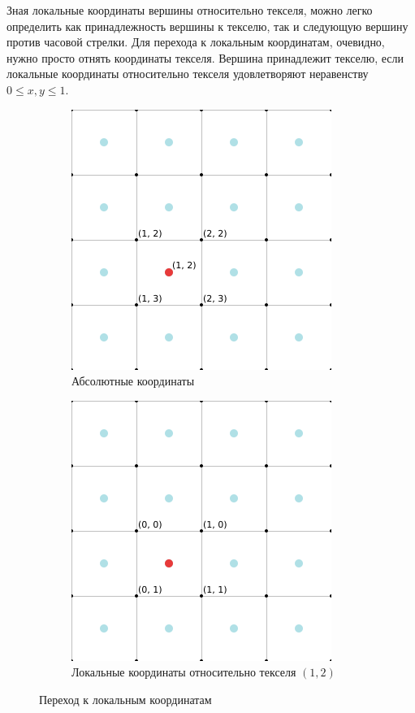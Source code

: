 \documentclass{fefu_thesis/cls/fefu}
\begin{document}
    Зная локальные координаты вершины относительно текселя, можно легко определить как принадлежность вершины к текселю, так и следующую вершину против часовой стрелки. Для перехода к локальным координатам, очевидно, нужно просто отнять координаты текселя. Вершина принадлежит текселю, если локальные координаты относительно текселя удовлетворяют неравенству $ 0 \leq x, y \leq 1$.

    \begin{figure}[H]
        \centering
        \begin{subfigure}[t]{.49\linewidth}
            \centering
            \includegraphics[scale=0.8]{images/texel_vertex_absolute.png}
            \caption{Абсолютные координаты}
        \end{subfigure}
        \begin{subfigure}[t]{.49\linewidth}
            \centering
            \includegraphics[scale=0.8]{images/texel_vertex_local.png}
            \caption{Локальные координаты относительно текселя $\left(1, 2\right)$}
        \end{subfigure}
        \caption{Переход к локальным координатам}
    \end{figure}
\end{document}
